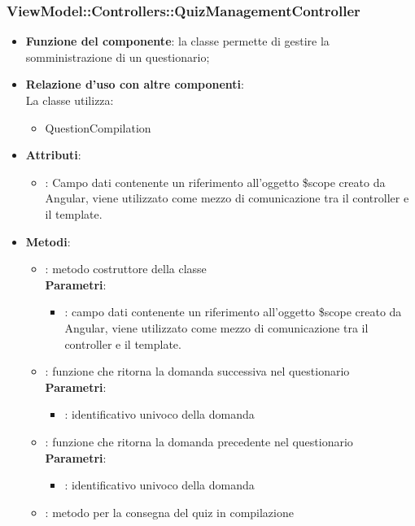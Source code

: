 \subsubsection{ViewModel::Controllers::QuizManagementController}
\begin{itemize}
\item\textbf{Funzione del componente}: la classe permette di gestire la somministrazione di un questionario;
	\item\textbf{Relazione d'uso con altre componenti}: \\
La classe utilizza:
	\begin{itemize}
		\item QuestionCompilation
	\end{itemize}
\item\textbf{Attributi}:
	\begin{itemize}
		\item{}: Campo dati contenente un riferimento all’oggetto \$scope creato da Angular, viene utilizzato come mezzo di comunicazione tra il controller e il template.\\
	\end{itemize}
\item\textbf{Metodi}:
	\begin{itemize}
		\item{}: metodo costruttore della classe\\
		\textbf{Parametri}:
			\begin{itemize}
				\item{}: campo dati contenente un riferimento all'oggetto \$scope creato da Angular, viene utilizzato come mezzo di comunicazione tra il controller e il template.\\
			\end{itemize}
		\item{}: funzione che ritorna la domanda successiva nel questionario\\
		\textbf{Parametri}:
			\begin{itemize}
				\item{}: identificativo univoco della domanda\\
			\end{itemize}
		\item{}: funzione che ritorna la domanda precedente nel questionario\\
		\textbf{Parametri}:
			\begin{itemize}
				\item{}: identificativo univoco della domanda\\
			\end{itemize}
		\item{}: metodo per la consegna del quiz in compilazione\\
	\end{itemize}
\end{itemize}


